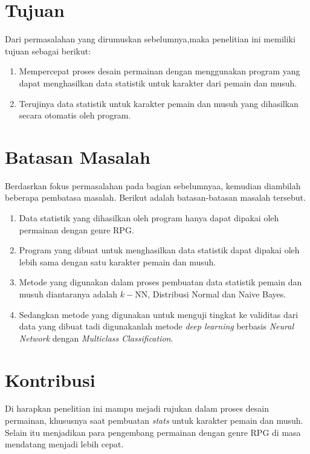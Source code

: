 \section{Tujuan}
\vspace{1ex}

Dari permasalahan yang dirumuskan sebelumnya,maka penelitian ini memiliki tujuan sebagai berikut: 

\begin{enumerate}
	\item Mempercepat proses desain permainan dengan menggunakan program yang dapat menghasilkan data statistik untuk karakter dari pemain dan musuh.

	\item Terujinya data statistik untuk karakter pemain dan musuh yang dihasilkan secara otomatis oleh program.
\end{enumerate}

\section{Batasan Masalah}
\vspace{1ex}

Berdasrkan fokus permasalahan pada bagian sebelumnyaa, kemudian diambilah beberapa pembatasa masalah. Berikut adalah batasan-batasan masalah tersebut.

\begin{enumerate}
	\item Data statistik yang dihasilkan oleh program hanya dapat dipakai oleh permainan dengan genre RPG.
	
	\item Program yang dibuat untuk menghasilkan data statistik dapat dipakai oleh lebih sama dengan satu karakter pemain dan musuh.

	\item Metode yang digunakan dalam proses pembuatan data statistik pemain dan musuh diantaranya adalah $k-$NN, Distribusi Normal dan Naive Bayes.
	
	\item Sedangkan metode yang digunakan untuk menguji tingkat ke validitas dari data yang dibuat tadi digunakanlah metode \textit{deep learning} berbasis \textit{Neural Network} dengan \textit{Multiclass Classification}.
\end{enumerate}

\section{Kontribusi}
\vspace{1ex}

Di harapkan penelitian ini mampu mejadi rujukan dalam proses desain permainan, khususnya saat pembuatan \textit{stats} untuk karakter pemain dan musuh. Selain itu menjadikan para pengembang permainan dengan genre RPG di masa mendatang menjadi lebih cepat.
